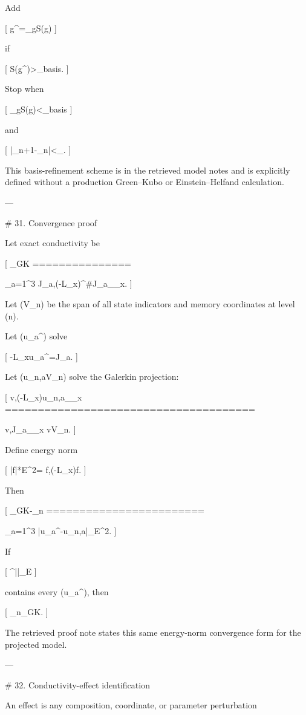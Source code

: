 Add

[
g^\star=\arg\max_gS(g)
]

if

[
S(g^\star)>\tau_{\rm basis}.
]

Stop when

[
\max_gS(g)<\tau_{\rm basis}
]

and

[
|\sigma_{n+1}-\sigma_n|<\tau_\sigma.
]

This basis-refinement scheme is in the retrieved model notes and is explicitly defined without a production Green–Kubo or Einstein–Helfand calculation. 

---

# 31. Convergence proof

Let exact conductivity be

[
\sigma_{\rm GK}
===============

\sum_{a=1}^3
\langle J_a,(-L_x)^#J_a\rangle_{\mu_x}.
]

Let (V_n) be the span of all state indicators and memory coordinates at level (n).

Let (u_a^\star) solve

[
-L_xu_a^\star=J_a.
]

Let (u_{n,a}\in V_n) solve the Galerkin projection:

[
\langle v,(-L_x)u_{n,a}\rangle_{\mu_x}
======================================

\langle v,J_a\rangle_{\mu_x}
\qquad
\forall v\in V_n.
]

Define energy norm

[
|f|*E^2=
\langle f,(-L_x)f.
]

Then

[
\sigma_{\rm GK}-\sigma_n
========================

\sum_{a=1}^3
|u_a^\star-u_{n,a}|_E^2.
]

If

[
^{|\cdot|_E}
]

contains every (u_a^\star), then

[
\sigma_n\to\sigma_{\rm GK}.
]

The retrieved proof note states this same energy-norm convergence form for the projected model. 

---

# 32. Conductivity-effect identification

An effect is any composition, coordinate, or parameter perturbation

